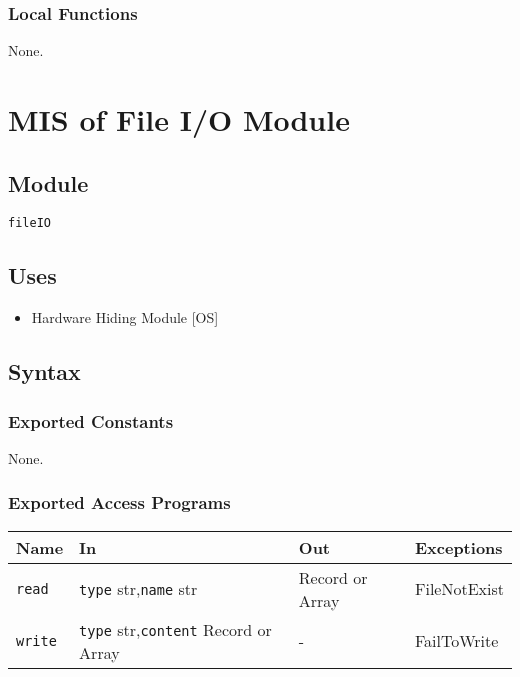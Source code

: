 \documentclass[12pt, titlepage]{article}
\begin{document}
\subsubsection{Local Functions}

None.


\newpage
\section{MIS of File I/O Module} \label{mFile} 

\subsection{Module}
\texttt{fileIO}

\subsection{Uses}
\begin{itemize}
\item Hardware Hiding Module [OS]
\end{itemize}

\subsection{Syntax}

\subsubsection{Exported Constants}
None.

\subsubsection{Exported Access Programs}

\begin{center}
\begin{tabular}{p{2cm} p{5cm} p{3cm} p{4cm}}
\hline
\textbf{Name} & \textbf{In} & \textbf{Out} & \textbf{Exceptions} \\
\hline
\texttt{read} & \texttt{type} str,\newline\texttt{name} str & Record or Array & FileNotExist \\
\texttt{write} & \texttt{type} str,\newline\texttt{content} Record or Array & - & FailToWrite \\
\hline
\end{tabular}
\end{center}
\end{document}
